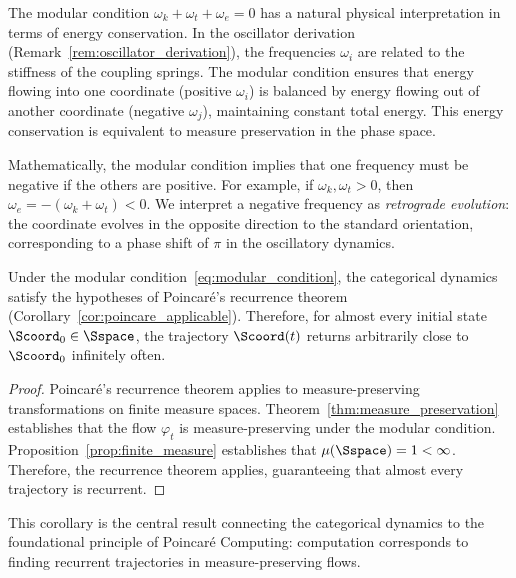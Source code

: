 \begin{remark}
\label{rem:modular_interpretation}
The modular condition $\omega_k + \omega_t + \omega_e = 0$ has a natural physical interpretation in terms of energy conservation. In the oscillator derivation (Remark~\ref{rem:oscillator_derivation}), the frequencies $\omega_i$ are related to the stiffness of the coupling springs. The modular condition ensures that energy flowing into one coordinate (positive $\omega_i$) is balanced by energy flowing out of another coordinate (negative $\omega_j$), maintaining constant total energy. This energy conservation is equivalent to measure preservation in the phase space.

Mathematically, the modular condition implies that one frequency must be negative if the others are positive. For example, if $\omega_k, \omega_t > 0$, then $\omega_e = -(\omega_k + \omega_t) < 0$. We interpret a negative frequency as \textit{retrograde evolution}: the coordinate evolves in the opposite direction to the standard orientation, corresponding to a phase shift of $\pi$ in the oscillatory dynamics.
\end{remark}

\begin{corollary}
\label{cor:recurrence_applicability}
Under the modular condition~\eqref{eq:modular_condition}, the categorical dynamics satisfy the hypotheses of Poincaré's recurrence theorem (Corollary~\ref{cor:poincare_applicable}). Therefore, for almost every initial state $\Scoord_0 \in \Sspace$, the trajectory $\Scoord(t)$ returns arbitrarily close to $\Scoord_0$ infinitely often.
\end{corollary}

\begin{proof}
Poincaré's recurrence theorem applies to measure-preserving transformations on finite measure spaces. Theorem~\ref{thm:measure_preservation} establishes that the flow $\varphi_t$ is measure-preserving under the modular condition. Proposition~\ref{prop:finite_measure} establishes that $\mu(\Sspace) = 1 < \infty$. Therefore, the recurrence theorem applies, guaranteeing that almost every trajectory is recurrent.
\end{proof}

This corollary is the central result connecting the categorical dynamics to the foundational principle of Poincaré Computing: computation corresponds to finding recurrent trajectories in measure-preserving flows.

